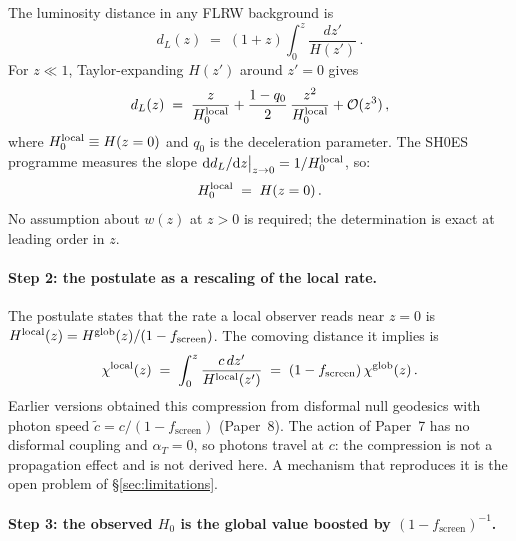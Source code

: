 \documentclass[12pt,a4paper]{article}
\newcommand{\fsc}{f_{\mathrm{screen}}}
\begin{document}
The luminosity distance in any FLRW background is
\begin{equation}
  d_L(z) \;=\; (1+z)\int_0^z \frac{dz'}{H(z')}\,.
  \label{eq:dL_def}
\end{equation}
For $z\ll 1$, Taylor-expanding $H(z')$ around $z'=0$ gives
\begin{equation}
  d_L(z) \;=\; \frac{z}{H_0^{\rm local}}
              + \frac{1-q_0}{2}\,\frac{z^2}{H_0^{\rm local}}
              + \mathcal{O}(z^3)\,,
  \label{eq:dL_taylor}
\end{equation}
where $H_0^{\rm local} \equiv H(z=0)$ and $q_0$ is the deceleration parameter.
The SH0ES programme measures the slope $\mathrm{d}d_L/\mathrm{d}z\big|_{z\to 0}
= 1/H_0^{\rm local}$, so:
\begin{equation}
  H_0^{\rm local} \;=\; H(z=0)\,.
  \label{eq:H0local_slope}
\end{equation}
No assumption about $w(z)$ at $z>0$ is required; the determination is exact
at leading order in $z$.

\paragraph{Step 2: the postulate as a rescaling of the local rate.}

The postulate states that the rate a local observer reads near $z=0$ is
$H^{\rm local}(z) = H^{\rm glob}(z)/(1-\fsc)$. The comoving distance it implies is
\begin{equation}
  \chi^{\rm local}(z) \;=\; \int_0^z\frac{c\,dz'}{H^{\rm local}(z')}
  \;=\; (1-\fsc)\,\chi^{\rm glob}(z)\,.
  \label{eq:chi_compress}
\end{equation}
Earlier versions obtained this compression from disformal null geodesics with
photon speed $\tilde c=c/(1-\fsc)$ (Paper~8). The action of Paper~7 has no
disformal coupling and $\alpha_T=0$, so photons travel at $c$: the compression
is not a propagation effect and is not derived here. A mechanism that
reproduces it is the open problem of §\ref{sec:limitations}.

\paragraph{Step 3: the observed $H_0$ is the global value boosted by $(1-\fsc)^{-1}$.}
\end{document}
